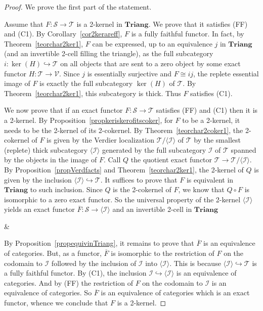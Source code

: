 \documentclass[11pt,reqno,a4paper]{amsart}
\theoremstyle{definition}
\theoremstyle{remark}
\def\nameit#1{\textrm{#1}~}
\def\thex{\nameit{Theorem}}
\def\prox{\nameit{Proposition}}
\def\corx{\nameit{Corollary}}
\newcommand{\T}{\mathcal{T}}
\renewcommand{\S}{\mathcal{S}}
\newcommand{\0}{\mathbf{0}}
\renewcommand{\1}{\mathbf{1}}
\newcommand{\I}{\mathcal{I}}
\newcommand{\Triang}{\mathbf{Triang}}
\def\:{\colon}
\def\c{\circ}
\begin{document}
\begin{proof}
    We prove the first part of the statement.

    Assume that $F\:\S\to \T$ is a 2-kernel in $\Triang$. We prove that it satisfies (FF) and (C1). By \corx\ref{cor2kerareff}, $F$ is a fully faithful functor. In fact, by \thex\ref{teorchar2ker1}, $F$ can be expressed, up to an equivalence $j$ in $\Triang$ (and an invertible 2-cell filling the triangle), as the full subcategory $i\:\ker(H)\hookrightarrow \T$ on all objects that are sent to a zero object by some exact functor $H\:\T\to \mathcal{V}$. Since $j$ is essentially surjective and $F\cong ij$, the replete essential image of $F$ is exactly the full subcategory $\ker(H)$ of $\T$. By \thex\ref{teorchar2ker1}, this subcategory is thick. Thus $F$ satisfies (C1).

    We now prove that if an exact functor $F\:\S\to \T$ satisfies (FF) and (C1) then it is a 2-kernel. By \prox\ref{propkeriskerofitscoker}, for $F$ to be a 2-kernel, it needs to be the 2-kernel of its 2-cokernel. By \thex\ref{teorchar2coker1}, the 2-cokernel of $F$ is given by the Verdier localization $\T/\langle \I \rangle$ of $\T$ by the smallest (replete) thick subcategory $\langle \I \rangle$ generated by the full subcategory $\I$ of $\T$ spanned by the objects in the image of $F$. Call $Q$ the quotient exact functor $\T\to \T/\langle \I \rangle$. By \prox\ref{propVerdfacts} and \thex\ref{teorchar2ker1}, the 2-kernel of $Q$ is given by the inclusion $\langle\I\rangle\hookrightarrow \T$. It suffices to prove that $F$ is equivalent in $\Triang$ to such inclusion. Since $Q$ is the 2-cokernel of $F$, we know that $Q\c F$ is isomorphic to a zero exact functor. So the universal property of the 2-kernel $\langle \I \rangle$ yields an exact functor $\overline{F}\:\S\to \langle \I \rangle$ and an invertible 2-cell in $\Triang$
    \begin{cd}[4]
        \S \& \T \\
	{\langle \I \rangle}
	\arrow["F", from=1-1, to=1-2]
	\arrow[xshift=-2ex, shift right=5, iso, "\theta"{inner sep=1ex},from=1-1, to=1-2]
	\arrow["{\overline{F}}"', dashed, from=1-1, to=2-1]
	\arrow[tail, from=2-1, to=1-2]
    \end{cd}
    By \prox\ref{propequivinTriang}, it remains to prove that $\overline{F}$ is an equivalence of categories. But, as a functor, $\overline{F}$ is isomorphic to the restriction of $F$ on the codomain to $\I$ followed by the inclusion of $\I$ into $\langle \I\rangle$. This is because $\langle \I\rangle\hookrightarrow \T$ is a fully faithful functor. By (C1), the inclusion $\I\hookrightarrow\langle\I\rangle$ is an equivalence of categories. And by (FF) the restriction of $F$ on the codomain to $\I$ is an equivalence of categories. So $\overline{F}$ is an equivalence of categories which is an exact functor, whence we conclude that $F$ is a 2-kernel.


\end{proof}
\end{document}
